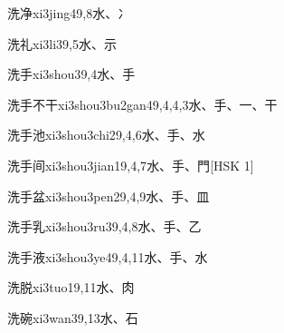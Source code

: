 \begin{entry}{洗净}{xi3jing4}{9,8}{⽔、⼎}
\end{entry}

\begin{entry}{洗礼}{xi3li3}{9,5}{⽔、⽰}
\end{entry}

\begin{entry}{洗手}{xi3shou3}{9,4}{⽔、⼿}
\end{entry}

\begin{entry}{洗手不干}{xi3shou3bu2gan4}{9,4,4,3}{⽔、⼿、⼀、⼲}
\end{entry}

\begin{entry}{洗手池}{xi3shou3chi2}{9,4,6}{⽔、⼿、⽔}
\end{entry}

\begin{entry}{洗手间}{xi3shou3jian1}{9,4,7}{⽔、⼿、⾨}[HSK 1]
\end{entry}

\begin{entry}{洗手盆}{xi3shou3pen2}{9,4,9}{⽔、⼿、⽫}
\end{entry}

\begin{entry}{洗手乳}{xi3shou3ru3}{9,4,8}{⽔、⼿、⼄}
\end{entry}

\begin{entry}{洗手液}{xi3shou3ye4}{9,4,11}{⽔、⼿、⽔}
\end{entry}

\begin{entry}{洗脱}{xi3tuo1}{9,11}{⽔、⾁}
\end{entry}

\begin{entry}{洗碗}{xi3wan3}{9,13}{⽔、⽯}
\end{entry}


